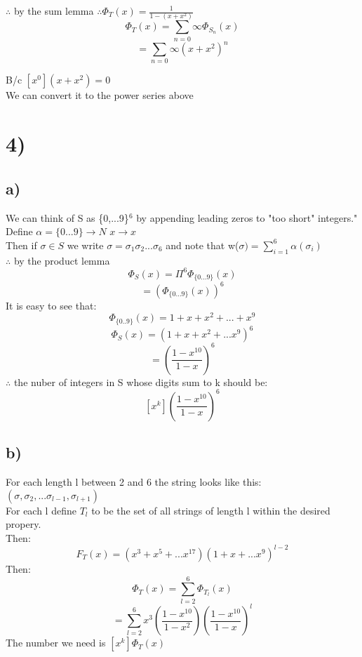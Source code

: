 \documentclass[12pt]{article}
\begin{document}
	$\therefore$ by the sum lemma $\therefore \Phi_T(x) = \frac{1}{1-(x+x^2)}$\\
	$$\Phi_T(x) = \sum_{n=0}{\infty}\Phi_{S_n}(x)$$
	$$= \sum_{n=0}{\infty}(x+x^2)^n$$
	
	B/c $[x^0](x+x^2) = 0$\\
	We can convert it to the power series above
	
	\section*{4)}
	\subsection*{a)}
	
	We can think of S as \{0,...9\}$^6$ by appending leading zeros to "too short" integers."\\
	Define $\alpha = \{0...9\} \rightarrow N$ $x \rightarrow x$\\
	Then if $\sigma \in S$ we write $\sigma = \sigma_1\sigma_2...\sigma_6$ and note that w($\sigma) = \sum_{i = 1}^{6}\alpha(\sigma_i)$\\
	
	$\therefore$ by the product lemma\\
	$$\Phi_S(x) = \Pi^{6}\Phi_{\{0...9\}}(x)$$
	$$= (\Phi_{\{0...9\}}(x))^6$$
	It is easy to see that:\\
	$$\Phi_{\{0..9\}}(x) = 1 + x + x^2 + ... + x^9$$
	$$\Phi_S(x) = (1 + x + x^2 + ... x^9)^6$$
	$$= (\frac{1-x^{10}}{1-x})^6$$
	$\therefore$ the nuber of integers in S whose digits sum to k should be:\\
	$$[x^k](\frac{1-x^{10}}{1-x})^6$$
	
	\subsection*{b)}
	
	For each length l between 2 and 6 the string looks like this:\\
	$(\sigma, \sigma_2, ...\sigma_{l-1}, \sigma_{l+1})$\\
	For each l define $T_l$ to be the set of all strings of length l within the desired propery.\\
	Then:\\
	$$F_T(x) = (x^3 + x^5 + ... x^{17})(1+x + ...x^9)^{l-2}$$
	Then:\\
	$$\Phi_T(x) = \sum_{l=2}^{6}\Phi_{T_l}(x)$$
	$$ = \sum_{l=2}^{6}x^3(\frac{1-x^{10}}{1-x^2})(\frac{1-x^{10}}{1-x})^l$$
	The number we need is $[x^k]\Phi_T(x)$\\
	
	
	
	
\end{document}
